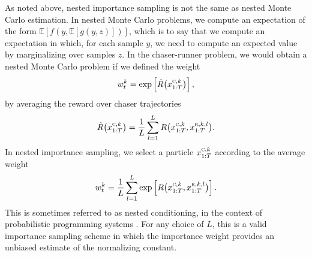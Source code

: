 \documentclass{article}
\begin{document}
As noted above, nested importance sampling is not the same as nested Monte Carlo estimation. In nested Monte Carlo problems, we compute an expectation of the form $\mathbb{E}[f(y, \mathbb{E}[g(y, z)])]$, which is to say that we compute an expectation in which, for each sample $y$, we need to compute an expected value by marginalizing over samples $z$. In the chaser-runner problem, we would obtain a nested Monte Carlo problem if we defined the weight
\[
    w^k_t 
    = 
    \exp
    \left[
        \hat{R}\big(
            x^{\textsc{c}, k}_{1:T}
            \big)
    \right],
\]
by averaging the reward over chaser trajectories
\[
    \hat{R}\big(
        x^{\textsc{c}, k}_{1:T}
    \big)
    =
    \frac{1}{L}
    \sum_{l=1}^L
    R
    \big(
        x^{\textsc{c}, k}_{1:T},
        x^{\textsc{r}, k, l}_{1:T}
    \big)
    .
\]
In nested importance sampling, we select a particle $x^{\textsc{c}, k}_{1:T}$ according to the average weight 
\[
    w^k_t 
    = 
    \frac{1}{L}    
    \sum_{l=1}^L
    \exp 
    \left[
    R
    \big(
        x^{\textsc{c}, k}_{1:T},
        x^{\textsc{r}, k, l}_{1:T}
    \big)
    \right].
\]
This is sometimes referred to as nested conditioning, in the context of probabilistic programming systems \cite{rainforth2018nestingb}.
For any choice of $L$, this is a valid importance sampling scheme in which the importance weight provides an unbiased estimate of the normalizing constant.
\end{document}
